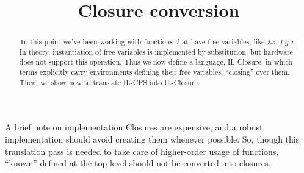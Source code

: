 \documentclass{amsart}
\title{Closure conversion}
\begin{document}
\maketitle

\begin{abstract}
    To this point we've been working with functions that have free variables, like $\lambda x. \; f \; g \; x$. In theory, instantiation of free variables is implemented by substitution, but hardware does not support this operation. Thus we now define a language, IL-Closure, in which terms explicitly carry environments defining their free variables, ``closing'' over them. Then, we show how to translate IL-CPS into IL-Closure.
\end{abstract}

\begin{section}{A brief note on implementation}
Closures are expensive, and a robust implementation should avoid creating them whenever possible. So, though this translation pass is needed to take care of higher-order usage of functions, ``known'' defined at the top-level should not be converted into closures.
\end{section}
\end{document}
